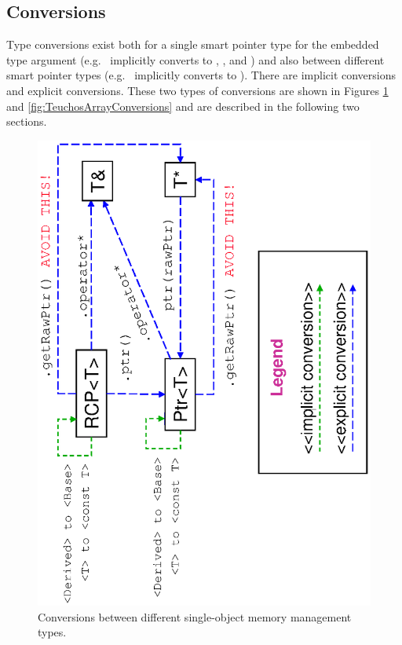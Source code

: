 \documentclass[pdf,ps2pdf,11pt]{SANDreport}
\begin{document}
%
{}\subsection{Conversions}
\label{sec:conversions}
%

Type conversions exist both for a single smart pointer type for the
embedded type argument (e.g.\ {} implicitly converts
to {}, {}, and {}) and also between different smart pointer types (e.g.\
{} implicitly converts to {}).  There are
implicit conversions and explicit conversions.  These two types of
conversions are shown in Figures {}\ref{fig:TeuchosPtrConversions} and
{}\ref{fig:TeuchosArrayConversions} and are described in the following
two sections.


{\bsinglespace
\begin{figure}[p]
\begin{center}
\includegraphics*[angle=270,scale=0.50]{TeuchosPtrConversions}
\end{center}
\caption{
\label{fig:TeuchosPtrConversions}
Conversions between different single-object memory management types.}
\end{figure}
\esinglespace}
\end{document}

